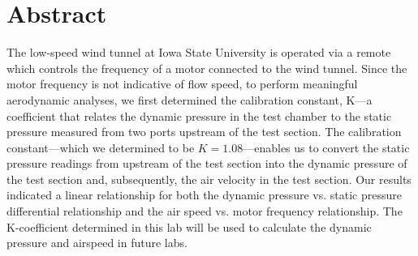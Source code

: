 \thispagestyle{plain} %



\chapter*{Abstract} %

The low-speed wind tunnel at Iowa State University is operated via a remote which controls the frequency of a motor connected to the wind tunnel. Since the motor frequency is not indicative of flow speed, to perform meaningful aerodynamic analyses, we first determined the calibration constant, \gls{K}—a coefficient that relates the dynamic pressure in the test chamber to the static pressure measured from two ports upstream of the test section. The calibration constant—which we determined to be $K=1.08$—enables us to convert the static pressure readings from upstream of the test section into the dynamic pressure of the test section and, subsequently, the air velocity in the test section. Our results indicated a linear relationship for both the dynamic pressure vs. static pressure differential relationship and the air speed vs. motor frequency relationship. The \gls{K}-coefficient determined in this lab will be used to calculate the dynamic pressure and airspeed in future labs.



